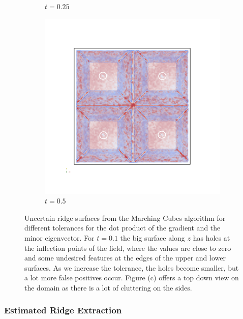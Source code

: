 \begin{figure}
\begin{subfigure}[]{0.49\textwidth}
        \caption{$t=0.25$}
        \label{fig:MCridgetol}
    \end{subfigure}
    \begin{subfigure}[]{0.49\textwidth}
        \includegraphics[width=\textwidth]{Images/MCridgetoltop.png}
        \caption{$t=0.5$}
        \label{fig:MCridgetop}
    \end{subfigure}
    \caption{Uncertain ridge surfaces from the Marching Cubes algorithm
    for different tolerances for the dot product of the gradient and the
    minor eigenvector. For $t=0.1$ the big surface along $z$ has holes
    at the inflection points of the field, where the values are close to
    zero and some undesired features at the edges of the upper and lower
    surfaces. As we increase the tolerance, the holes become smaller,
    but a lot more false positives occur. Figure (c) offers a top down
    view on the domain as there is a lot of cluttering on the sides.}
    \label{fig:MCridges}
\end{figure}

\subsubsection{Estimated Ridge Extraction}

